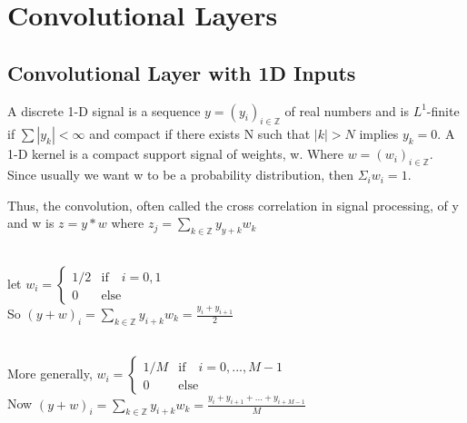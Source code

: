 \section{Convolutional Layers}
\subsection{Convolutional Layer with 1D Inputs}
\begin{definition}
    A discrete 1-D signal is a sequence $y=(y_i)_{i\in\mathbb{Z}}$ of real numbers and is $L^1$-finite if $\sum |y_k| < \infty$ and compact if there exists N such that $|k| > N$ implies $y_k=0$.
    A 1-D kernel is a compact support signal of weights, w. Where $w = (w_i)_{i\in\mathbb{Z}}$. Since usually we want w to be a probability distribution, then $\Sigma_{i}w_i = 1$.
\end{definition}
Thus, the convolution, often called the cross correlation in signal processing, of y and w is $z=y*w$ where $z_{j} = \sum_{k\in\mathbb{Z}} y_{y+k}w_{k}$
\begin{example} \quad
\\
let
$w_i = \begin{cases}
    1/2 &\text{if} \quad i=0,1\\
    0 &\text{else}
\end{cases}$
\\
So $(y+w)_i=\sum_{k\in\mathbb{Z}} y_{i+k}w_k=\frac{y_i+y_{i+1}}{2}$
\end{example}
\noindent
\\
More generally,
$w_i = \begin{cases}
    1/M &\text{if} \quad i=0,...,M-1\\
    0 &\text{else}
\end{cases}$
\\
Now $(y+w)_i=\sum_{k\in\mathbb{Z}} y_{i+k}w_k=\frac{y_i+y_{i+1}+...+y_{i+M-1}}{M}$
\\
